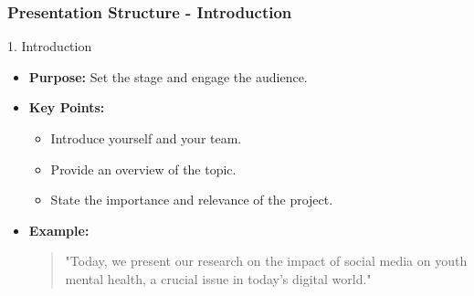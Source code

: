 \documentclass[aspectratio=169]{beamer}
\begin{document}
\begin{frame}[fragile]
    \frametitle{Presentation Structure - Introduction}
    \begin{block}{1. Introduction}
        \begin{itemize}
            \item \textbf{Purpose:} Set the stage and engage the audience.
            \item \textbf{Key Points:}
                \begin{itemize}
                    \item Introduce yourself and your team.
                    \item Provide an overview of the topic.
                    \item State the importance and relevance of the project.
                \end{itemize}
            \item \textbf{Example:} 
                \begin{quote}
                    "Today, we present our research on the impact of social media on youth mental health, a crucial issue in today's digital world."
                \end{quote}
        \end{itemize}
    \end{block}
\end{frame}
\end{document}
